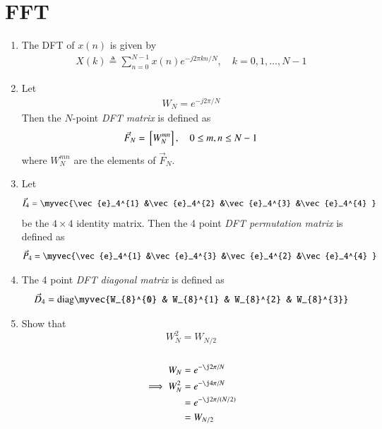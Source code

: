 \documentclass[journal,12pt,twocolumn]{IEEEtran}
\renewcommand\thesection{\arabic{section}}
\begin{document}
\section{FFT}
\begin{enumerate}[label=\arabic*.,ref=\thesection.\theenumi]
    \item The DFT of $x(n)$ is given by
    \begin{align}
        X(k) \triangleq \sum_{n=0}^{N-1} x(n) e^{-j 2 \pi k n / N}, \quad k=0,1, \ldots, N-1
    \end{align}
\item Let 
	\begin{align}
W_{N} = e^{-j2\pi/N} 
	\end{align}
		Then the $N$-point {\em DFT matrix} is defined as 
	\begin{align}
		\vec{F}_{N} = {}\left[W_{N}^{mn}\right], \quad 0 \le m,n \le N-1 
	\end{align}
	where $W_{N}^{mn}$ are the elements of $\vec{F}_{N}$.
\item Let 
	\begin{align}
		\vec{I}_4 = \myvec{\vec{e}_4^{1} &\vec{e}_4^{2} &\vec{e}_4^{3} &\vec{e}_4^{4} }
	\end{align}
		be the $4\times 4$ identity matrix.  Then the 4 point {\em DFT permutation matrix} is defined as 
	\begin{align}
		\vec{P}_4 = \myvec{\vec{e}_4^{1} &\vec{e}_4^{3} &\vec{e}_4^{2} &\vec{e}_4^{4} }
	\end{align}
\item The 4 point {\em DFT diagonal matrix} is defined as 
	\begin{align}
		\vec{D}_4 = \text{diag}\myvec{W_{8}^{0} & W_{8}^{1} & W_{8}^{2} & W_{8}^{3}}
	\end{align}
\item Show that 
\begin{equation}
    W_{N}^{2}=W_{N/2}
\end{equation}\\
\solution \begin{align}
    W_N &= e^{-\j2\pi/N}\\
    \implies W_N^2 &= e^{-\j4\pi/N}\\
    &= e^{-\j2\pi/(N/2)}\\
    &= W_{N/2}
\end{align}

\end{enumerate}
\end{document}
